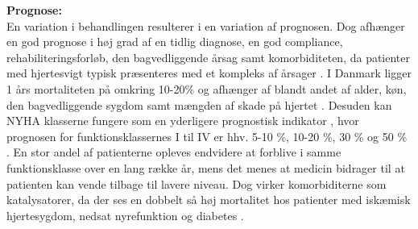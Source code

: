 \textbf{Prognose:}\\
En variation i behandlingen resulterer i en variation af prognosen. Dog afhænger en god prognose i høj grad af en tidlig diagnose, en god compliance, rehabiliteringsforløb, den bagvedliggende årsag samt komorbiditeten, da patienter med hjertesvigt typisk præsenteres med et kompleks af årsager \cite{sstpakke}. I Danmark ligger 1 års mortaliteten på omkring 10-20\% og afhænger af blandt andet af alder, køn, den bagvedliggende sygdom samt mængden af skade på hjertet \cite{7,sundhed}. Desuden kan NYHA klasserne fungere som en yderligere prognostisk indikator \cite{Hjerteinsufficiens}, hvor prognosen for funktionsklassernes I til IV er hhv. 5-10 \%, 10-20 \%, 30 \% og 50 \% \cite{sundhed}. En stor andel af patienterne opleves endvidere at forblive i samme funktionsklasse over en lang række år, mens det menes at medicin bidrager til at patienten kan vende tilbage til lavere niveau. Dog virker komorbiditerne som katalysatorer, da der ses en dobbelt så høj mortalitet hos patienter med iskæmisk hjertesygdom, nedsat nyrefunktion og diabetes \cite{Hjerteinsufficiens}.
